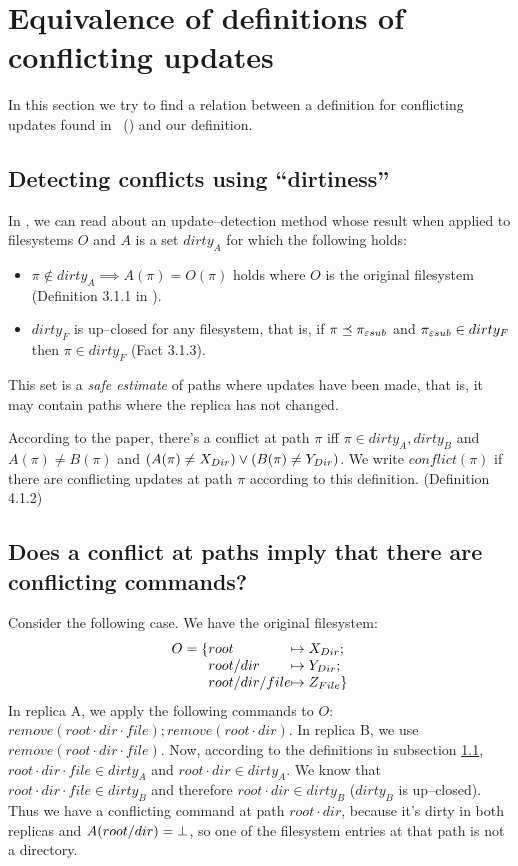 \section{Equivalence of definitions of conflicting updates}
\label{cbp:bp}

In this section we try to find a relation between
a definition for conflicting updates found in \BP~(\cite{BP:whatis}) and
our definition.

\subsection{Detecting conflicts using ``dirtiness''}
\label{subsec:defdirty}

In \BP, we can read about an update--detection method whose result when
applied to filesystems \(O\) and \(A\) is a set
\(dirty_A\) for which the following holds:
\begin{itemize}
\item
\(\pi\not\in dirty_A \implies A(\pi)=O(\pi)\) holds where \(O\) is the
original filesystem (Definition 3.1.1 in \BP).
\item
\(dirty_F\) is up--closed for any filesystem,
that is, if \(\pi\preceq\pi_{\varepsilon sub}\) and \(\pi_{\varepsilon sub}\in dirty_F\) then \(\pi\in
dirty_F\) (Fact 3.1.3).
\end{itemize}
This set is a \emph{safe estimate} of paths where updates have been
made, that is, it may contain paths where the replica has not
changed.

According to the paper, there's a conflict at path \(\pi\) iff
\(\pi\in dirty_A, dirty_B\) and \(A(\pi)\neq B(\pi)\) and
\((A(\pi)\neq X_{Dir})\vee(B(\pi)\neq Y_{Dir})\).
We write \(conflict(\pi)\) if there are conflicting updates at
path \(\pi\) according to this definition. (Definition 4.1.2)

\subsection{Does a conflict at paths imply that there are
conflicting commands?}
\label{subsec:pathimplcom}

Consider the following case. 
We have the original filesystem:
\[\begin{array}{r@{}l@{}l}
O=\{&root&\mapsto\cdir{X};\\
&root\cdot dir&\mapsto\cdir{Y};\\
&root\cdot dir\cdot file&\mapsto\cfile{Z}\}\end{array}\]
In replica A, we apply the following commands to \(O\): 
\(remove(root\cdot dir\cdot file); remove(root\cdot dir)\).
In replica B, we use
\(remove(root\cdot dir\cdot file)\).
Now, according to the definitions in subsection
\ref{subsec:defdirty}, \(root\cdot dir\cdot file\in dirty_A\) and 
\(root\cdot dir\in dirty_A\). We know that \(root\cdot dir\cdot file\in
dirty_B\) and therefore \(root\cdot dir\in dirty_B\) (\(dirty_B\) is
up--closed). Thus we have a conflicting command at path 
\(root\cdot dir\), because it's dirty in both replicas and 
\(A(root/ dir)=\bot\), so one of the filesystem entries at that path is
not a directory.

